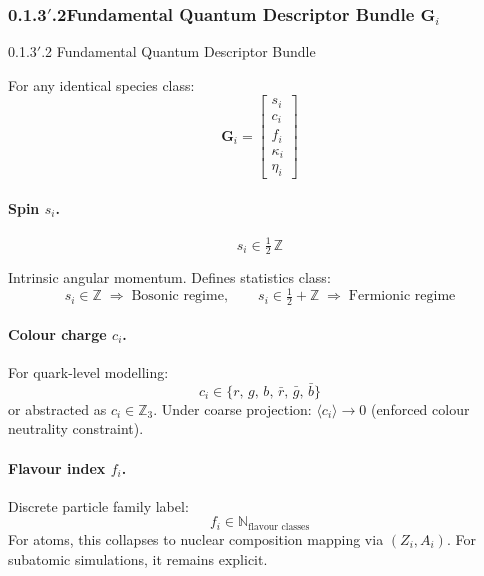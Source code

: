 \documentclass[11pt, a4paper, oneside]{article}
\theoremstyle{definition}
\theoremstyle{remark}
\newcommand{\N}{\mathbb{N}}
\newcommand{\Z}{\mathbb{Z}}
\newcommand{\boldG}{\mathbf{G}}
\begin{document}
\subsubsection*{0.1.3$'$.2\quad Fundamental Quantum Descriptor Bundle
               \texorpdfstring{$\boldG_i$}{Gi}}
%
  {0.1.3$'$.2 Fundamental Quantum Descriptor Bundle}
\label{sec:quantum-bundle}

For any identical species class:
%
\begin{equation}
  \boldG_i =
  \begin{bmatrix}
    s_i \\ c_i \\ f_i \\ \kappa_i \\ \eta_i
  \end{bmatrix}
  \label{eq:quantum-bundle}
\end{equation}

\paragraph{Spin \texorpdfstring{$s_i$}{si}.}

\[
  s_i \in \tfrac{1}{2}\,\Z
\]

Intrinsic angular momentum.
Defines statistics class:
%
\[
  s_i \in \Z \;\Rightarrow\; \text{Bosonic regime},
  \qquad
  s_i \in \tfrac{1}{2} + \Z \;\Rightarrow\; \text{Fermionic regime}
\]

\paragraph{Colour charge \texorpdfstring{$c_i$}{ci}.}

For quark-level modelling:
\[
  c_i \in \{r,\,g,\,b,\,\bar{r},\,\bar{g},\,\bar{b}\}
\]
or abstracted as $c_i \in \Z_3$.
Under coarse projection: $\langle c_i \rangle \to 0$
(enforced colour neutrality constraint).

\paragraph{Flavour index \texorpdfstring{$f_i$}{fi}.}

Discrete particle family label:
\[
  f_i \in \N_{\text{flavour classes}}
\]
For atoms, this collapses to nuclear composition mapping via
$(Z_i, A_i)$.
For subatomic simulations, it remains explicit.
\end{document}
